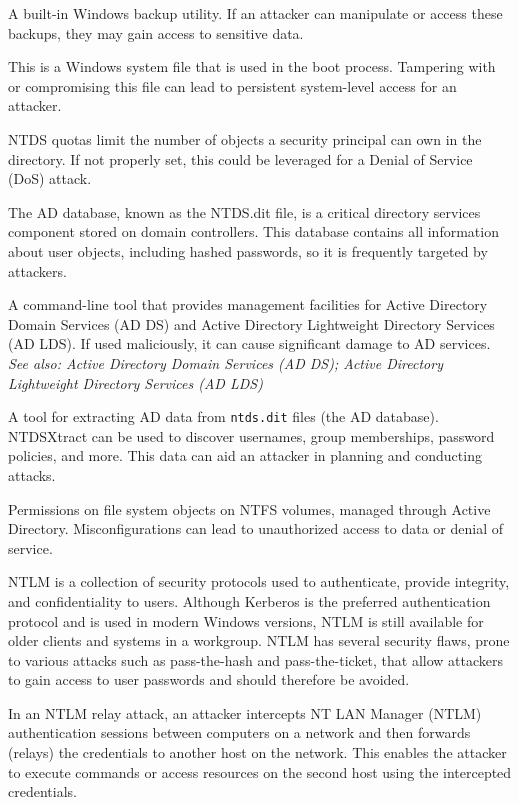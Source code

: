  A built-in Windows backup utility. If an attacker can manipulate or access these backups, they may gain access to sensitive data.

 This is a Windows system file that is used in the boot process. Tampering with or compromising this file can lead to persistent system-level access for an attacker.

 NTDS quotas limit the number of objects a security principal can own in the directory. If not properly set, this could be leveraged for a Denial of Service (DoS) attack.

The AD database, known as the NTDS.dit file, is a critical directory services component stored on domain controllers. This database contains all information about user objects, including hashed passwords, so it is frequently targeted by attackers.

 A command-line tool that provides management facilities for Active Directory Domain Services (AD DS) and Active Directory Lightweight Directory Services (AD LDS). If used maliciously, it can cause significant damage to AD services.
\textit{See also: Active Directory Domain Services (AD DS); Active Directory Lightweight Directory Services (AD LDS)}

 A tool for extracting AD data from \texttt{ntds.dit} files (the AD database). NTDSXtract can be used to discover usernames, group memberships, password policies, and more. This data can aid an attacker in planning and conducting attacks.

 Permissions on file system objects on NTFS volumes, managed through Active Directory. Misconfigurations can lead to unauthorized access to data or denial of service.

 NTLM is a collection of security protocols used to authenticate, provide integrity, and confidentiality to users. Although Kerberos is the preferred authentication protocol and is used in modern Windows versions, NTLM is still available for older clients and systems in a workgroup. NTLM has several security flaws, prone to various attacks such as pass-the-hash and pass-the-ticket, that allow attackers to gain access to user passwords and should therefore be avoided.

 In an NTLM relay attack, an attacker intercepts NT LAN Manager (NTLM) authentication sessions between computers on a network and then forwards (relays) the credentials to another host on the network. This enables the attacker to execute commands or access resources on the second host using the intercepted credentials.

